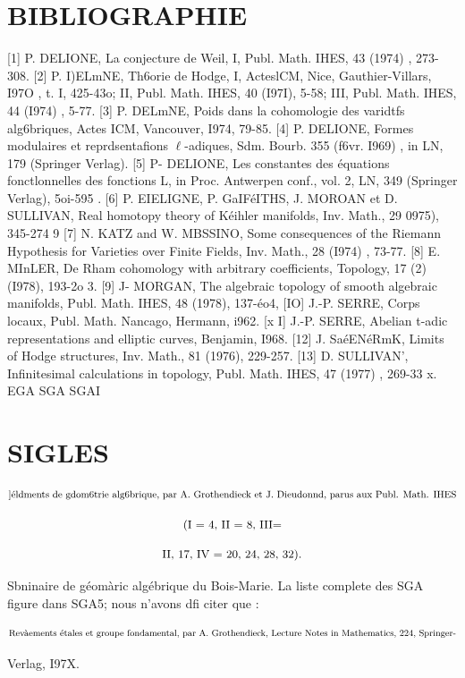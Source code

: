 \documentclass[11pt]{article}
\theoremstyle{remark}
\begin{document}
\section*{BIBLIOGRAPHIE}

[1] P. DELIONE, La conjecture de Weil, I, Publ. Math. IHES, 43 (1974) , 273-308. [2] P. I)ELmNE, Th6orie de Hodge, I, ActeslCM, Nice, Gauthier-Villars, I97O , t. I, 425-43o; II, Publ. Math. IHES, 40 (I97I), 5-58; III, Publ. Math. IHES, 44 (I974) , 5-77. [3] P. DELmNE, Poids dans la cohomologie des varidtfs alg6briques, Actes ICM, Vancouver, I974, 79-85. [4] P. DELIONE, Formes modulaires et reprdsentafions \(\ell\)-adiques, Sdm. Bourb. 355 (f6vr. I969) , in LN, 179 (Springer Verlag). [5] P- DELIONE, Les constantes des équations fonctlonnelles des fonctions L, in Proc. Antwerpen conf., vol. 2, LN, 349 (Springer Verlag), 5oi-595 . [6] P. EIELIGNE, P. GaIFéITHS, J. MOROAN et D. SULLIVAN, Real homotopy theory of Kéihler manifolds, Inv. Math., 29 0975), 345-274  9 [7] N. KATZ and W. MBSSINO, Some consequences of the Riemann Hypothesis for Varieties over Finite Fields, Inv. Math., 28 (I974) , 73-77. [8] E. MInLER, De Rham cohomology with arbitrary coefficients, Topology, 17 (2) (I978), 193-2o 3. [9] J- MORGAN, The algebraic topology of smooth algebraic manifolds, Publ. Math. IHES, 48 (1978), 137-éo4, [IO] J.-P. SERRE, Corps locaux, Publ. Math. Nancago, Hermann, i962. [x I] J.-P. SERRE, Abelian t-adic representations and elliptic curves, Benjamin, I968. [12] J. SaéENéRmK, Limits of Hodge structures, Inv. Math., 81 (1976), 229-257. [13] D. SULLIVAN', Infinitesimal calculations in topology, Publ. Math. IHES, 47 (1977) , 269-33 x. EGA SGA SGAI

\section*{SIGLES}

\[\text{\small ]éldments de gdom6trie alg6brique, par A. Grothendieck et J. Dieudonnd, parus aux Publ. Math. IHES}\]

\[\text{\small (I = 4, II = 8, III=}\]

\[\text{\small II, 17, IV = 20, 24, 28, 32).}\]

Sbninaire de géomàric algébrique du Bois-Marie. La liste complete des SGA figure dans SGA5; nous n'avons dfi citer que :

\[\text{\small Revàements étales et groupe fondamental, par A. Grothendieck, Lecture Notes in Mathematics, 224, Springer-}\]

Verlag, I97X.
\end{document}
